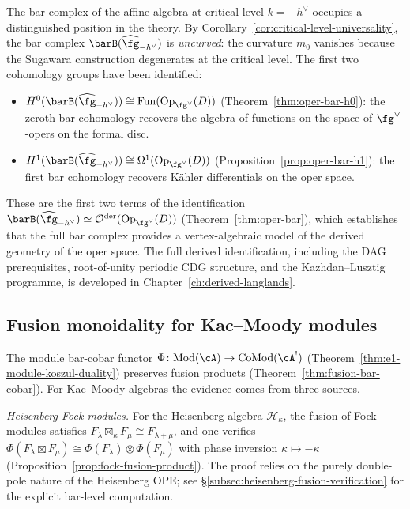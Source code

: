 The bar complex of the affine algebra at critical level
$k = -h^\vee$ occupies a distinguished position in the theory.
By Corollary~\ref{cor:critical-level-universality}, the bar
complex $\barB(\widehat{\fg}_{-h^\vee})$ is \emph{uncurved}:
the curvature $m_0$ vanishes because the Sugawara construction
degenerates at the critical level.  The first two cohomology
groups have been identified:

\begin{itemize}
\item $H^0(\barB(\widehat{\fg}_{-h^\vee}))
  \cong \mathrm{Fun}(\mathrm{Op}_{\fg^\vee}(D))$
  (Theorem~\ref{thm:oper-bar-h0}): the zeroth bar cohomology
  recovers the algebra of functions on the space of
  $\fg^\vee$-opers on the formal disc.
\item $H^1(\barB(\widehat{\fg}_{-h^\vee}))
  \cong \Omega^1(\mathrm{Op}_{\fg^\vee}(D))$
  (Proposition~\ref{prop:oper-bar-h1}): the first bar cohomology
  recovers K\"ahler differentials on the oper space.
\end{itemize}

These are the first two terms of the identification
$\barB(\widehat{\fg}_{-h^\vee})
\simeq \mathcal{O}^{\mathrm{der}}(\mathrm{Op}_{\fg^\vee}(D))$
(Theorem~\ref{thm:oper-bar}), which establishes that the full
bar complex provides a vertex-algebraic model of the derived
geometry of the oper space.  The full derived identification,
including the DAG prerequisites, root-of-unity periodic CDG
structure, and the Kazhdan--Lusztig programme, is developed in
Chapter~\ref{ch:derived-langlands}.

\subsection{Fusion monoidality for Kac--Moody modules}
\label{subsec:km-fusion-monoidality}

The module bar-cobar functor
$\Phi\colon \mathrm{Mod}(\cA) \to \mathrm{CoMod}(\cA^!)$
(Theorem~\ref{thm:e1-module-koszul-duality}) preserves
fusion products
(Theorem~\ref{thm:fusion-bar-cobar}).  For Kac--Moody
algebras the evidence comes from three sources.

\emph{Heisenberg Fock modules.}
For the Heisenberg algebra $\mathcal{H}_\kappa$, the fusion of
Fock modules satisfies
$F_\lambda \boxtimes_\kappa F_\mu \cong F_{\lambda+\mu}$,
and one verifies
$\Phi(F_\lambda \boxtimes F_\mu)
\cong \Phi(F_\lambda) \otimes \Phi(F_\mu)$
with phase inversion $\kappa \mapsto -\kappa$
(Proposition~\ref{prop:fock-fusion-product}).  The proof relies
on the purely double-pole nature of the Heisenberg OPE; see
\S\ref{subsec:heisenberg-fusion-verification} for the explicit
bar-level computation.

